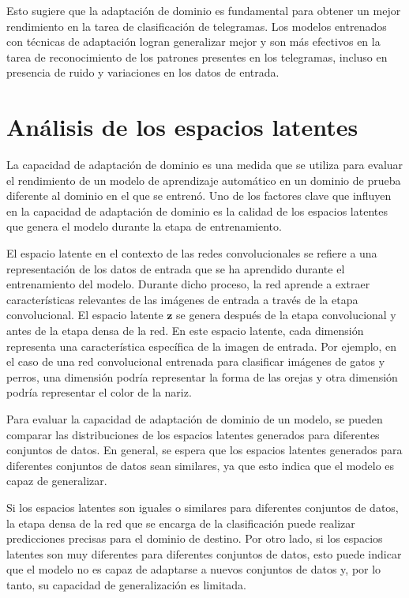 Esto sugiere que la adaptación de dominio es fundamental para obtener un mejor rendimiento en la tarea de clasificación
de telegramas. Los modelos entrenados con técnicas de adaptación logran generalizar mejor y son más efectivos en la
tarea de reconocimiento de los patrones presentes en los telegramas, incluso en presencia de ruido y variaciones en los
datos de entrada.

\section{Análisis de los espacios latentes}

La capacidad de adaptación de dominio es una medida que se utiliza para evaluar el rendimiento de un modelo de
aprendizaje automático en un dominio de prueba diferente al dominio en el que se entrenó. Uno de los factores clave que
influyen en la capacidad de adaptación de dominio es la calidad de los espacios latentes que genera el modelo durante
la etapa de entrenamiento.

El espacio latente en el contexto de las redes convolucionales se refiere a una representación de los datos de entrada
que se ha aprendido durante el entrenamiento del modelo. Durante dicho proceso, la red aprende a extraer
características relevantes de las imágenes de entrada a través de la etapa convolucional. El espacio latente
$\mathbf{z}$ se genera después de la etapa convolucional y antes de la etapa densa de la red. En este espacio latente,
cada dimensión representa una característica específica de la imagen de entrada. Por ejemplo, en el caso de una red
convolucional entrenada para clasificar imágenes de gatos y perros, una dimensión podría representar la forma de las
orejas y otra dimensión podría representar el color de la nariz.

Para evaluar la capacidad de adaptación de dominio de un modelo, se pueden comparar las distribuciones de los espacios
latentes generados para diferentes conjuntos de datos. En general, se espera que los espacios latentes generados para
diferentes conjuntos de datos sean similares, ya que esto indica que el modelo es capaz de generalizar.

Si los espacios latentes son iguales o similares para diferentes conjuntos de datos, la etapa densa de la red que se
encarga de la clasificación puede realizar predicciones precisas para el dominio de destino. Por otro lado, si los
espacios latentes son muy diferentes para diferentes conjuntos de datos, esto puede indicar que el modelo no es capaz
de adaptarse a nuevos conjuntos de datos y, por lo tanto, su capacidad de generalización es limitada.


